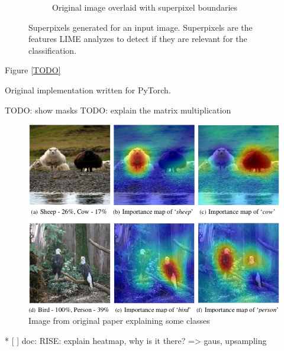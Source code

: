 \begin{figure}[H]
\begin{subfigure}[t]{.35\textwidth}
        \caption{Original image overlaid with superpixel boundaries}
    \end{subfigure}
    \caption{Superpixels generated for an input image. Superpixels are the features LIME analyzes to detect if they are relevant for the classification.\cite{limeoreilly}}
    \label{lime_superpixel}
\end{figure}



Figure \ref{TODO}

Original implementation written for PyTorch.

TODO: show masks
TODO: explain the matrix multiplication

\begin{figure}[H]
\centering
\caption{Image from original paper explaining some classes}
\includegraphics[width=12cm]{chapters/02_methods/images/rise.png}
\end{figure}


* [ ] doc: RISE: explain heatmap, why is it there? => gaus, upsampling

